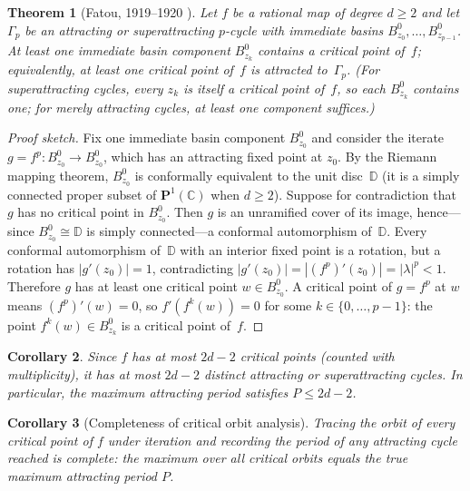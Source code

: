 \documentclass[12pt]{article}
\newtheorem{theorem}{Theorem}[section]
\newtheorem{corollary}[theorem]{Corollary}
\theoremstyle{definition}
\newcommand{\C}{\mathbb{C}}
\newcommand{\Pone}{\mathbf{P}^1(\C)}
\begin{document}
\begin{theorem}[Fatou, 1919--1920 \cite{Fatou1919,Fatou1920}]
\label{thm:fatou}
Let $f$ be a rational map of degree $d\geq 2$ and let $\Gamma_p$ be an
attracting or superattracting $p$-cycle with immediate basins
$B^0_{z_0},\ldots,B^0_{z_{p-1}}$.  At least one immediate basin component
$B^0_{z_k}$ contains a critical point of~$f$; equivalently, at least one
critical point of~$f$ is attracted to~$\Gamma_p$.  (For superattracting
cycles, every $z_k$ is itself a critical point of~$f$, so each $B^0_{z_k}$
contains one; for merely attracting cycles, at least one component
suffices.)
\end{theorem}

\begin{proof}[Proof sketch]
Fix one immediate basin component $B^0_{z_0}$ and consider the iterate
$g = f^p\colon B^0_{z_0}\to B^0_{z_0}$, which has an attracting fixed
point at $z_0$.  By the Riemann mapping theorem, $B^0_{z_0}$ is
conformally equivalent to the unit disc~$\mathbb{D}$ (it is a simply
connected proper subset of $\Pone$ when $d\geq 2$).  Suppose for
contradiction that $g$ has no critical point in $B^0_{z_0}$.  Then $g$
is an unramified cover of its image, hence---since $B^0_{z_0}\cong\mathbb{D}$
is simply connected---a conformal automorphism of~$\mathbb{D}$.  Every
conformal automorphism of~$\mathbb{D}$ with an interior fixed point is a
rotation, but a rotation has $|g'(z_0)|=1$, contradicting $|g'(z_0)|=
|(f^p)'(z_0)|=|\lambda|^p<1$.  Therefore $g$ has at least one critical
point $w\in B^0_{z_0}$.  A critical point of $g=f^p$ at $w$ means
$(f^p)'(w)=0$, so $f'(f^k(w))=0$ for some $k\in\{0,\ldots,p-1\}$:
the point $f^k(w)\in B^0_{z_k}$ is a critical point of~$f$.
\end{proof}

\begin{corollary}\label{cor:bound}
Since $f$ has at most $2d-2$ critical points (counted with multiplicity),
it has at most $2d-2$ distinct attracting or superattracting cycles.
In particular, the maximum attracting period satisfies $P\leq 2d-2$.
\end{corollary}

\begin{corollary}[Completeness of critical orbit analysis]\label{cor:complete}
Tracing the orbit of every critical point of $f$ under iteration and
recording the period of any attracting cycle reached is \emph{complete}:
the maximum over all critical orbits equals the true maximum attracting
period $P$.
\end{corollary}
\end{document}
